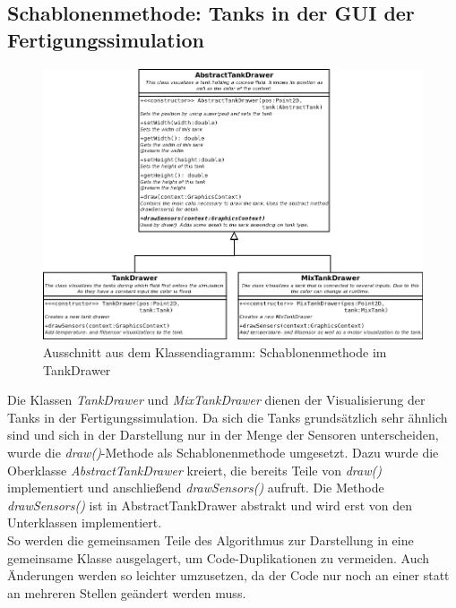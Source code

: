 \documentclass[parskip=full]{scrartcl}
\begin{document}
\subsection{Schablonenmethode: Tanks in der GUI der Fertigungssimulation}
\begin{figure}[H]
  \centering
  \includegraphics[scale=0.4]{design/pattern-screenshots/template-TankDrawer.png}
  \caption{Ausschnitt aus dem Klassendiagramm: Schablonenmethode im TankDrawer}
\end{figure}
Die Klassen \emph{TankDrawer} und \emph{MixTankDrawer} dienen der Visualisierung der Tanks in der Fertigungssimulation. Da sich die Tanks grunds\"atzlich
sehr \"ahnlich sind und sich in der Darstellung nur in der Menge der Sensoren unterscheiden, wurde die \emph{draw()}-Methode als Schablonenmethode umgesetzt.
Dazu wurde die Oberklasse \emph{AbstractTankDrawer} kreiert, die bereits Teile von \emph{draw()} implementiert und anschlie{\ss}end \emph{drawSensors()}
aufruft. Die Methode \emph{drawSensors()} ist in AbstractTankDrawer abstrakt und wird erst von den Unterklassen implementiert.\\
So werden die gemeinsamen Teile des Algorithmus zur Darstellung in eine gemeinsame Klasse ausgelagert, um Code-Duplikationen zu vermeiden. Auch \"Anderungen
werden so leichter umzusetzen, da der Code nur noch an einer statt an mehreren Stellen ge\"andert werden muss.

\pagebreak
\end{document}
